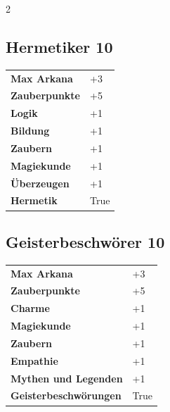 \begin{multicols}{2}
\begin{tcolorbox}

\end{tcolorbox}

\begin{tcolorbox}
    \subsection*{Hermetiker \hfill \small{10 }}
    \tcblower




\begin{tabular}{@{}ll@{}}
    \textbf{Max Arkana} & +3\\
    \textbf{Zauberpunkte} & +5\\
    \textbf{Logik} & +1\\
    \textbf{Bildung} & +1\\
    \textbf{Zaubern} & +1\\
    \textbf{Magiekunde} & +1\\
    \textbf{Überzeugen} & +1\\
    \textbf{Hermetik} & True\\
\end{tabular}


\end{tcolorbox}

\begin{tcolorbox}
    \subsection*{Geisterbeschwörer \hfill \small{10 }}
    \tcblower




\begin{tabular}{@{}ll@{}}
    \textbf{Max Arkana} & +3\\
    \textbf{Zauberpunkte} & +5\\
    \textbf{Charme} & +1\\
    \textbf{Magiekunde} & +1\\
    \textbf{Zaubern} & +1\\
    \textbf{Empathie} & +1\\
    \textbf{Mythen und Legenden} & +1\\
    \textbf{Geisterbeschwörungen} & True\\
\end{tabular}


\end{tcolorbox}
\end{multicols}
